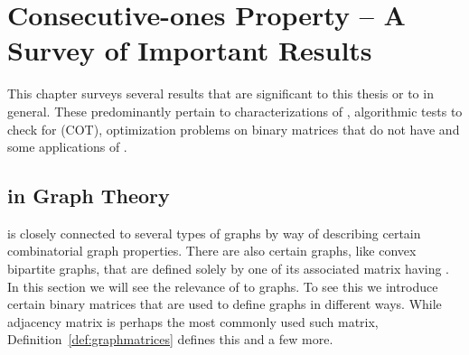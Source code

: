 \xclearpage


\chapter[COP -- A Survey]{Consecutive-ones Property -- A Survey of
  Important Results} 
\label{ch:copsurvey}

This chapter surveys several results that are significant to this
thesis or to \COP in general. These predominantly pertain to
characterizations of \COP, algorithmic tests to check for \COP (COT),
optimization problems on binary matrices that do not have \COP and
some applications of \COP.



\section{\COP in Graph Theory}

\COP is closely connected to several types of graphs by way of
describing certain combinatorial graph properties. There are also
certain graphs, like convex bipartite graphs, that are defined solely
by one of its associated matrix having \COP.  In this section we will
see the relevance of \cop to graphs.  To see this we introduce certain
binary matrices that are used to define graphs in different
ways. While adjacency matrix is perhaps the most commonly used such
matrix, Definition~\ref{def:graphmatrices} defines this and a few
more.

